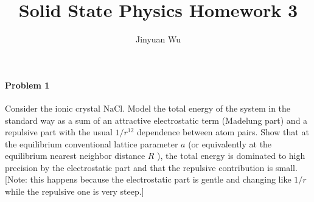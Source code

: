 \documentclass[hyperref, a4paper]{article}
\title{Solid State Physics Homework 3}
\author{Jinyuan Wu}
\begin{document}
\maketitle

\paragraph{Problem 1} Consider the ionic crystal $\mathrm{NaCl}$. Model the total energy of the system in the standard way as a sum of an attractive electrostatic term (Madelung part) and a repulsive part with the usual $1 / r^{12}$ dependence between atom pairs. Show that at the equilibrium conventional lattice parameter $a$ (or equivalently at the equilibrium nearest neighbor distance $R$ ), the total energy is dominated to high precision by the electrostatic part and that the repulsive contribution is small. [Note: this happens because the electrostatic part is gentle and changing like $1 / r$ while the repulsive one is very steep.]
\end{document}
